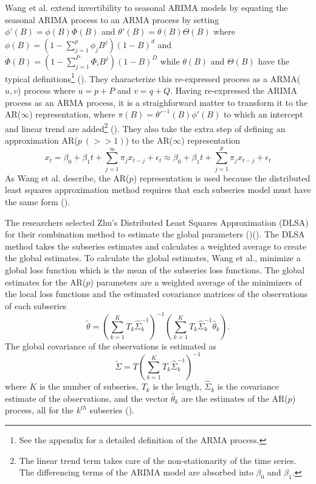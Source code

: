\documentclass[
]{article}
\begin{document}

Wang et al. extend invertibility to seasonal ARIMA models by equating the seasonal ARIMA process to an ARMA process by setting $\phi'(B) = \phi(B)\Phi(B)$ and $\theta'(B) = \theta(B) \Theta(B)$ where $\phi(B) = (1 - \sum_{j = 1}^p \phi_j B^j)(1 - B)^d$ and $\Phi(B) = (1 - \sum_{j = 1}^P \Phi_i B^j)(1 - B)^D$ while $\theta(B)$ and $\Theta(B)$ have the typical definitions\footnote{See the appendix for a detailed definition of the ARMA process.} (\cite*[p.~16-17]{wang_distributed_2020}). They characterize this re-expressed process as a ARMA($u,v$) process where $u = p + P$ and $v = q + Q$. Having re-expressed the ARIMA process as an ARMA process, it is a straighforward matter to transform it to the AR($\infty$) representation, where $\pi(B) = \theta'^{-1}(B) \phi'(B)$ to which an intercept and linear trend are added\footnote{The linear trend term takes care of the non-stationarity of the time series. The differencing terms of the ARIMA model are absorbed into $\beta_0$ and $\beta_1$.} (\cite[p.~17]{wang_distributed_2020}). They also take the extra step of defining an approximation AR($p ~ (>> 1)$) to the AR($\infty$) representation 
\begin{equation}
  x_t = \beta_0 + \beta_1 t + \sum_{j = 1}^{\infty} \pi_j x_{t-j} + \epsilon_t \approx \beta_0 + \beta_1 t + \sum_{j = 1}^p \pi_j x_{t-j} + \epsilon_t
\end{equation}
As Wang et al. describe, the AR($p$) representation is used because the distributed least squares approximation method requires that each subseries model must have the same form (\cite*[p.~18]{wang_distributed_2020}). 


The researchers selected Zhu's Distributed Least Squares Approximation (DLSA) for their combination method to estimate the global parameters (\cite[p.~18]{wang_distributed_2020})(\cite{zhu_dlsa_2019}). The DLSA method takes the subseries estimates and calculates a weighted average to create the global estimates. To calculate the global estimates, Wang et al., minimize a global loss function which is the mean of the subseries loss functions. The global estimates for the AR($p$) parameters are a weighted average of the minimizers of the local loss functions and the estimated covariance matrices of the observations of each subseries
\[\tilde{\theta} = \left(\sum_{k = 1}^K T_k \hat{\Sigma}_k^{-1}\right)^{-1}\left(\sum_{k = 1}^K T_k \hat{\Sigma}_k^{-1} \hat{\theta}_k\right).\] 
The global covariance of the observations is estimated as
\[\tilde{\Sigma} = T\left(\sum_{k = 1}^K T_k \hat{\Sigma}_k^{-1}\right)^{-1}\]
where $K$ is the number of subseries, $T_k$ is the length, $\hat{\Sigma}_k$ is the covariance estimate of the observations, and the vector $\hat{\theta}_k$ are the estimates of the AR($p$) process, all for the $k^{th}$ subseries (\cite[p.~18-19]{wang_distributed_2020}).
\end{document}
